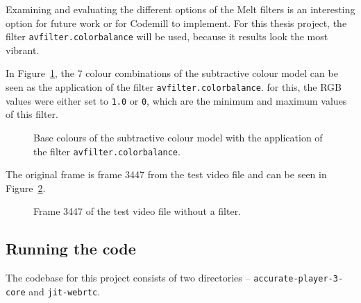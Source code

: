 \documentclass[../MasterThesis.tex]{subfiles}
\begin{document}
Examining and evaluating the different options of the Melt filters is an interesting option for future work or for Codemill to implement. For this thesis project, the filter \texttt{avfilter.colorbalance} will be used, because it results look the most vibrant.

In Figure~\ref{figure:septopus}, the 7 colour combinations of the subtractive colour model can be seen as the application of the filter \texttt{avfilter.colorbalance}. for this, the RGB values were either set to \texttt{1.0} or \texttt{0}, which are the minimum and maximum values of this filter. 



\begin{figure}[H]
	\begin{center}
		\label{figure:septopus}
		\caption[Base colours with the application of the filter \texttt{avfilter.colorbalance}.]{Base colours of the subtractive colour model with the application of the filter \texttt{avfilter.colorbalance}.}
	\end{center}
\end{figure}

The original frame is frame 3447 from the test video file and can be seen in Figure~\ref{figure:septo_nofilter}.

\begin{figure}[H]
	\begin{center}
		\label{figure:septo_nofilter}
		\caption[Frame 3447 of the test video file without a filter.]{Frame 3447 of the test video file without a filter.}
	\end{center}
\end{figure}












\subsection{Running the code} \label{subsection:runninghtecode}

The codebase for this project consists of two directories -- \texttt{accurate-player-3-core} and \texttt{jit-webrtc}.
\end{document}
